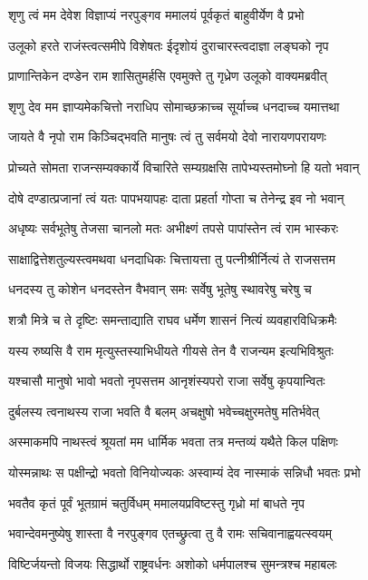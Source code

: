 \twolineshloka
{शृणु त्वं मम देवेश विज्ञाप्यं नरपुङ्गव}
{ममालयं पूर्वकृतं बाहुवीर्येण वै प्रभो}%

\twolineshloka
{उलूको हरते राजंस्त्वत्समीपे विशेषतः}
{ईदृशोयं दुराचारस्त्वदाज्ञा लङ्घको नृप}%

\twolineshloka
{प्राणान्तिकेन दण्डेन राम शासितुमर्हसि}
{एवमुक्ते तु गृध्रेण उलूको वाक्यमब्रवीत्}%

\twolineshloka
{शृणु देव मम ज्ञाप्यमेकचित्तो नराधिप}
{सोमाच्छक्राच्च सूर्याच्च धनदाच्च यमात्तथा}%

\twolineshloka
{जायते वै नृपो राम किञ्चिद्भवति मानुषः}
{त्वं तु सर्वमयो देवो नारायणपरायणः}%

\twolineshloka
{प्रोच्यते सोमता राजन्सम्यक्कार्ये विचारिते}
{सम्यग्रक्षसि तापेभ्यस्तमोघ्नो हि यतो भवान्}%

\twolineshloka
{दोषे दण्डात्प्रजानां त्वं यतः पापभयापहः}
{दाता प्रहर्ता गोप्ता च तेनेन्द्र इव नो भवान्}%

\twolineshloka
{अधृष्यः सर्वभूतेषु तेजसा चानलो मतः}
{अभीक्ष्णं तपसे पापांस्तेन त्वं राम भास्करः}%

\twolineshloka
{साक्षाद्वित्तेशतुल्यस्त्वमथवा धनदाधिकः}
{चित्तायत्ता तु पत्नीश्रीर्नित्यं ते राजसत्तम}%

\twolineshloka
{धनदस्य तु कोशेन धनदस्तेन वैभवान्}
{समः सर्वेषु भूतेषु स्थावरेषु चरेषु च}%

\twolineshloka
{शत्रौ मित्रे च ते दृष्टिः समन्ताद्याति राघव}
{धर्मेण शासनं नित्यं व्यवहारविधिक्रमैः}%

\twolineshloka
{यस्य रुष्यसि वै राम मृत्युस्तस्याभिधीयते}
{गीयसे तेन वै राजन्यम इत्यभिविश्रुतः}%

\twolineshloka
{यश्चासौ मानुषो भावो भवतो नृपसत्तम}
{आनृशंस्यपरो राजा सर्वेषु कृपयान्वितः}%

\twolineshloka
{दुर्बलस्य त्वनाथस्य राजा भवति वै बलम्}
{अचक्षुषो भवेच्चक्षुरमतेषु मतिर्भवेत्}%

\twolineshloka
{अस्माकमपि नाथस्त्वं श्रूयतां मम धार्मिक}
{भवता तत्र मन्तव्यं यथैते किल पक्षिणः}%

\twolineshloka
{योस्मन्नाथः स पक्षीन्द्रो भवतो विनियोज्यकः}
{अस्वाम्यं देव नास्माकं सन्निधौ भवतः प्रभो}%

\twolineshloka
{भवतैव कृतं पूर्वं भूतग्रामं चतुर्विधम्}
{ममालयप्रविष्टस्तु गृध्रो मां बाधते नृप}%

\twolineshloka
{भवान्देवमनुष्येषु शास्ता वै नरपुङ्गव}
{एतच्छ्रुत्वा तु वै रामः सचिवानाह्वयत्स्वयम्}%

\twolineshloka
{विष्टिर्जयन्तो विजयः सिद्धार्थो राष्ट्रवर्धनः}
{अशोको धर्मपालश्च सुमन्त्रश्च महाबलः}%

